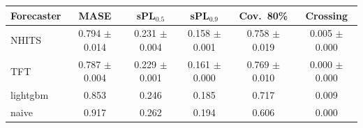 \begin{tabular}{lccccc}
\toprule
Forecaster & MASE & sPL$_{0.5}$ & sPL$_{0.9}$ & Cov.\ 80\% & Crossing \\
\midrule
NHITS & 0.794 $\pm$ 0.014 & 0.231 $\pm$ 0.004 & 0.158 $\pm$ 0.001 & 0.758 $\pm$ 0.019 & 0.005 $\pm$ 0.000 \\
TFT & 0.787 $\pm$ 0.004 & 0.229 $\pm$ 0.001 & 0.161 $\pm$ 0.000 & 0.769 $\pm$ 0.010 & 0.000 $\pm$ 0.000 \\
lightgbm & 0.853 & 0.246 & 0.185 & 0.717 & 0.009 \\
naive & 0.917 & 0.262 & 0.194 & 0.606 & 0.000 \\
\bottomrule
\end{tabular}